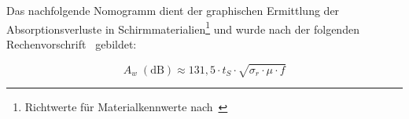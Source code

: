 

Das nachfolgende Nomogramm dient der graphischen Ermittlung der Absorptionsverluste in Schirm\-materialien\footnote{Richtwerte für Materialkennwerte nach~\cite{Simplified_shielding}} und wurde nach der folgenden Rechenvorschrift~\cite{Simplified_shielding} gebildet:

\begin{equation}
    A_w \; \left(\text{dB}\right) \approx 131,5 \cdot t_S \cdot \sqrt{\sigma_r \cdot \mu \cdot f}
\end{equation}